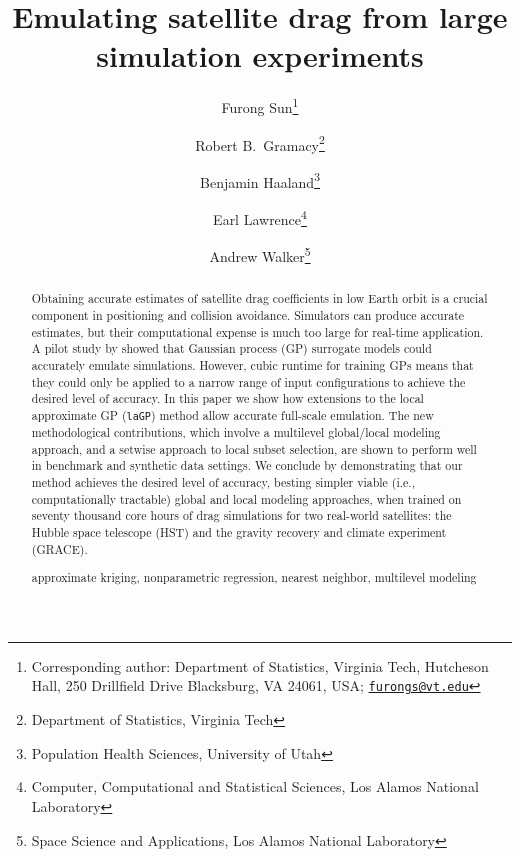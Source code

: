 \documentclass[12pt]{article}
\begin{document}
\newcommand{\bm}[1]{\mbox{\boldmath $#1$}}
\newcommand{\vect}[1]{\boldsymbol{#1}}
\newcommand{\mb}[1]{#1}%
\newcommand{\bE}[0]{\mathbb{E}}
\newcommand{\bV}[0]{\mathbb{V}\mathrm{ar}}
\newcommand{\bP}[0]{\mathbb{P}}
\newcommand{\ve}[0]{\varepsilon}
\newcommand{\mN}[0]{\mathcal{N}}
\newcommand{\iidsim}[0]{\stackrel{\mathrm{iid}}{\sim}}
\newcommand{\NA}[0]{{\tt NA}}
\newcommand{\cB}{\mathcal{B}}
\newcommand{\R}{\mathbb{R}}
\newcommand{\Rp}{\R_+}



\title{\vspace{-1cm}Emulating satellite drag from large simulation experiments}
\author{Furong Sun\thanks{Corresponding author: Department of Statistics, Virginia Tech,
Hutcheson Hall, 250 Drillfield Drive
Blacksburg, VA 24061, USA;
\href{mailto:furongs@vt.edu}{\tt furongs@vt.edu}}
\and Robert B.~Gramacy\thanks{Department of Statistics, Virginia Tech}
\and Benjamin Haaland\thanks{Population Health Sciences, University of Utah}
\and Earl Lawrence\thanks{Computer, Computational and Statistical Sciences, Los Alamos National Laboratory}
\and Andrew Walker\thanks{Space Science and Applications, Los Alamos National Laboratory}
}
\date{}

\maketitle

\vspace{-0.2cm}
\begin{abstract}
Obtaining accurate estimates of satellite drag coefficients in low Earth orbit
is a crucial component in positioning and collision avoidance.  Simulators can
produce accurate estimates, but their computational expense is much too large
for real-time application.  A pilot study by \citet{metha:etal:2014} showed
that Gaussian process (GP) surrogate models could accurately emulate
simulations.  However, cubic runtime for training GPs means that they could
only be applied to a narrow range of input configurations to achieve the
desired level of accuracy.  In this paper we show how extensions to the local
approximate GP ({\tt laGP}) method allow accurate full-scale
emulation.  The new methodological contributions, which involve a multilevel
global/local modeling approach, and a setwise approach to local subset
selection, are shown to perform well in benchmark and synthetic data settings.
We conclude by demonstrating that our method achieves the desired level of
accuracy, besting simpler viable (i.e., computationally tractable) global and
local modeling approaches, when trained on seventy thousand core hours of drag
simulations for two real-world satellites: the Hubble space
telescope (HST) and the gravity recovery and climate experiment (GRACE).

\bigskip
{} approximate kriging, nonparametric regression, nearest neighbor, multilevel modeling
\end{abstract}
\end{document}
